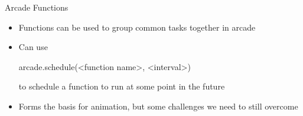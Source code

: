 \documentclass[pdf, aspectratio=169, 12pt]{beamer}
\begin{document}




\begin{frame}[fragile]{Arcade Functions}
	\begin{itemize}
		\item Functions can be used to group common tasks together in arcade
		\item Can use
			\begin{pythoncode}
				arcade.schedule(<function name>, <interval>)
			\end{pythoncode}
			to schedule a function to run at some point in the future
		\item Forms the basis for animation, but some challenges we need to still overcome
	\end{itemize}
\end{frame}
\end{document}
